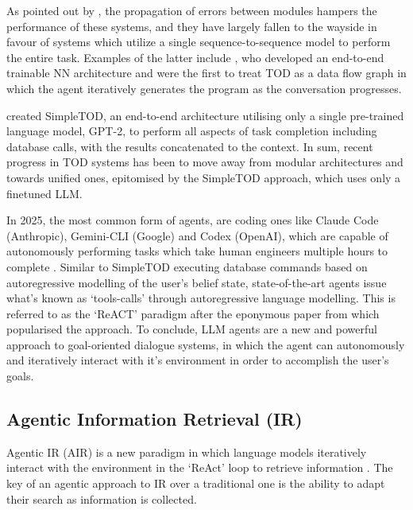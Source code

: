 \documentclass[11pt]{article}
\begin{document}
As pointed out by \citet{yi_survey_2025}, the propagation of errors between modules hampers the performance of these systems, and they have largely fallen to the wayside in favour of systems which utilize a single sequence-to-sequence model to perform the entire task.
Examples of the latter include \citet{wen_network-based_2017}, who developed an end-to-end trainable NN architecture and \citet{andreas_task-oriented_2020} were the first to treat TOD as a data flow graph in which the agent iteratively generates the program as the conversation progresses.

\citet{hosseini-asl_simple_2022} created SimpleTOD, an end-to-end architecture utilising only a single pre-trained language model, GPT-2, to perform all aspects of task completion including database calls, with the results concatenated to the context.
In sum, recent progress in TOD systems has been to move away from modular architectures and towards unified ones, epitomised by the SimpleTOD approach, which uses only a finetuned LLM. 


In 2025, the most common form of agents, are coding ones like Claude Code (Anthropic), Gemini-CLI (Google) and Codex (OpenAI), which are capable of autonomously performing tasks which take human engineers multiple hours to complete \cite{kwa_measuring_2025}.
Similar to SimpleTOD executing database commands based on autoregressive modelling of the user's belief state, state-of-the-art agents issue what's known as `tools-calls' through autoregressive language modelling. This is referred to as the `ReACT' paradigm after the eponymous paper from \citet{yao_reac_2023} which popularised the approach. To conclude, LLM agents are a new and powerful approach to goal-oriented dialogue systems, in which the agent can autonomously and iteratively interact with it's environment in order to accomplish the user's goals.


\subsection{Agentic Information Retrieval (IR)}
Agentic IR (AIR) is a new paradigm in which language models iteratively interact with the environment in the `ReAct' loop to retrieve information \citet{zhang_agentic_2025}.
The key of an agentic approach to IR over a traditional one is the ability to adapt their search as information is collected.
\end{document}
